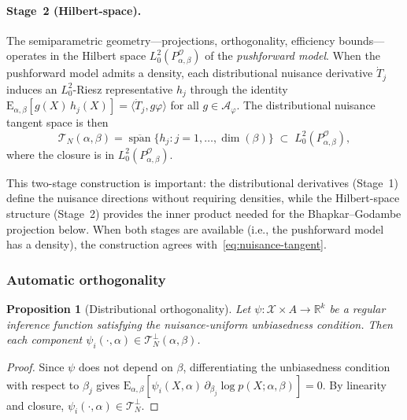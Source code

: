 \documentclass[11pt,a4paper]{article}
\newtheorem{proposition}[theorem]{Proposition}
\newcommand{\E}{\mathrm{E}}
\newcommand{\R}{\mathbb{R}}
\newcommand{\ie}{{i.e.}, }
\begin{document}
\paragraph{Stage~2 (Hilbert-space).}
The semiparametric geometry---projections, orthogonality, efficiency
bounds---operates in the Hilbert space $L^2_0(P_{\alpha,\beta}^{\mathcal O})$
of the \emph{pushforward model}.  When the pushforward model admits a
density, each distributional nuisance derivative $\dot T_j$ induces an
$L^2_0$-Riesz representative $h_j$ through the identity
$\E_{\alpha,\beta}[g(X)\,h_j(X)]
= \langle \dot T_j, g\varphi \rangle$ for all $g \in \mathcal A_\varphi$.
The distributional nuisance tangent space is then
\begin{equation}\label{eq:nuisance-tangent-dist}
\mathcal T_N(\alpha, \beta)
= \overline{\operatorname{span}}\!\{h_j : j = 1, \ldots, \dim(\beta)\}
\;\subset\; L^2_0(P_{\alpha,\beta}^{\mathcal O}),
\end{equation}
where the closure is in $L^2_0(P_{\alpha,\beta}^{\mathcal O})$.

This two-stage construction is important: the distributional derivatives
(Stage~1) define the nuisance directions without requiring densities, while
the Hilbert-space structure (Stage~2) provides the inner product needed for
the Bhapkar--Godambe projection below.  When both stages are available
(\ie the pushforward model has a density), the construction
agrees with~\eqref{eq:nuisance-tangent}.

\subsubsection*{Automatic orthogonality}

\begin{proposition}[Distributional orthogonality]\label{prop:orthogonality}
Let $\psi : \mathcal X \times A \to \R^k$ be a regular inference function
satisfying the nuisance-uniform unbiasedness condition.  Then each
component $\psi_i(\cdot, \alpha) \in \mathcal T_N^\perp(\alpha, \beta)$.
\end{proposition}

\begin{proof}
Since $\psi$ does not depend on $\beta$, differentiating the unbiasedness
condition with respect to $\beta_j$ gives
$\E_{\alpha,\beta}[\psi_i(X, \alpha)\,\partial_{\beta_j} \log p(X; \alpha, \beta)] = 0$.
By linearity and closure,
$\psi_i(\cdot, \alpha) \in \mathcal T_N^\perp$.
\end{proof}
\end{document}
